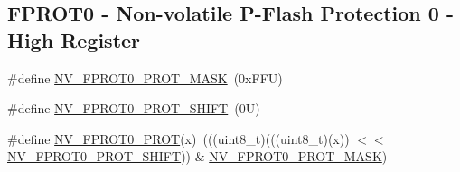 \subsection*{F\+P\+R\+O\+T0 -\/ Non-\/volatile P-\/\+Flash Protection 0 -\/ High Register}
\begin{DoxyCompactItemize}
\item 
\#define \mbox{\hyperlink{group___n_v___register___masks_gafb9244a297e4e856c53e7cb9515d8549}{N\+V\+\_\+\+F\+P\+R\+O\+T0\+\_\+\+P\+R\+O\+T\+\_\+\+M\+A\+SK}}~(0x\+F\+F\+U)
\item 
\#define \mbox{\hyperlink{group___n_v___register___masks_gaaae2badd9a03af803a09537c6c89382a}{N\+V\+\_\+\+F\+P\+R\+O\+T0\+\_\+\+P\+R\+O\+T\+\_\+\+S\+H\+I\+FT}}~(0\+U)
\item 
\#define \mbox{\hyperlink{group___n_v___register___masks_ga69a376822e2425a5933dc10569a42d3d}{N\+V\+\_\+\+F\+P\+R\+O\+T0\+\_\+\+P\+R\+OT}}(x)~(((uint8\+\_\+t)(((uint8\+\_\+t)(x)) $<$$<$ \mbox{\hyperlink{group___n_v___register___masks_gaaae2badd9a03af803a09537c6c89382a}{N\+V\+\_\+\+F\+P\+R\+O\+T0\+\_\+\+P\+R\+O\+T\+\_\+\+S\+H\+I\+FT}})) \& \mbox{\hyperlink{group___n_v___register___masks_gafb9244a297e4e856c53e7cb9515d8549}{N\+V\+\_\+\+F\+P\+R\+O\+T0\+\_\+\+P\+R\+O\+T\+\_\+\+M\+A\+SK}})
\end{DoxyCompactItemize}

